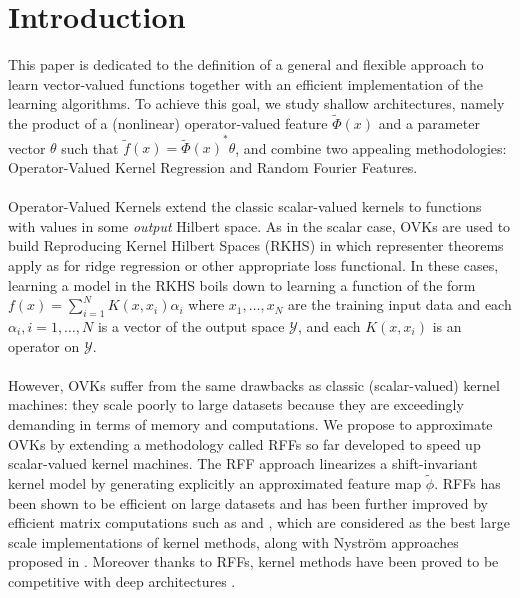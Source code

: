 \documentclass[twoside,11pt]{article}
\begin{document}

\section{Introduction}
This paper is dedicated to the definition of a general and flexible approach to
learn vector-valued functions together with an efficient implementation of the
learning algorithms. To achieve this goal, we study shallow architectures,
namely the product of a (nonlinear) operator-valued feature
$\widetilde{\Phi}(x)$ and a parameter vector $\theta$ such that
$\widetilde{f}(x) = {\widetilde{\Phi}(x)}^* \theta$, and combine two appealing
methodologies: Operator-Valued Kernel Regression and Random Fourier Features.
\paragraph{}
Operator-Valued Kernels \citep{Micchelli2005,Carmeli2010,Kadri_aistat10,
Brouard2011,Alvarez2012} extend the classic scalar-valued kernels to functions
with values in some \emph{output} Hilbert space. As in the scalar case,
\acfp{OVK} are used to build Reproducing Kernel Hilbert Spaces (\acs{RKHS}) in
which representer theorems apply as for ridge regression or other appropriate
loss functional. In these cases, learning a model in the \acs{RKHS} boils down
to learning a function of the form $f(x)=\sum_{i=1}^N K(x,x_i)\alpha_i$ where
$x_1, \ldots, x_N$ are the training input data and each $\alpha_i, i=1, \ldots,
N$ is a vector of the output space $\mathcal{Y}$, and each $K(x,x_i)$ is an
operator on $\mathcal{Y}$.
\paragraph{}
However, \acsp{OVK} suffer from the same drawbacks as classic
(sca\-lar-va\-lued) kernel machines: they scale poorly to large datasets
because they are exceedingly demanding in terms of memory and computations. We
propose to approximate OVKs by extending a methodology called \acfp{RFF}
\citep{Rahimi2007, Le2013, Yang2015, sriper2015, Bach2015, sutherland2015,
rudi2016generalization} so far developed to speed up scalar-valued kernel
machines. The \acs{RFF} approach linearizes a shift-invariant kernel model by
generating explicitly an approximated feature map $\tilde{\phi}$. \acsp{RFF}
has been shown to be efficient on large datasets \citep{rudi2016generalization}
and has been further improved by efficient matrix computations such as
\citep[``FastFood'']{Le2013} and \citep[``SORF'']{felix2016orthogonal}, which
are considered as the best large scale implementations of kernel methods, along
with Nystr\"om approaches proposed in \citet{drineas2005nystrom}. Moreover
thanks to \acsp{RFF}, kernel methods have been proved to be competitive with
deep architectures \citep{lu2014scale, dai2014scalable, yang2015deep}.
\end{document}
